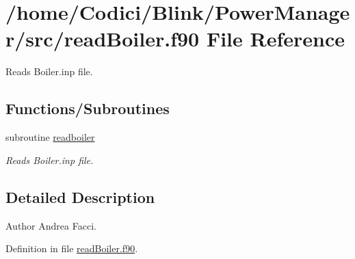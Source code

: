 \hypertarget{read_boiler_8f90}{\section{/home/\-Codici/\-Blink/\-Power\-Manager/src/read\-Boiler.f90 File Reference}
\label{read_boiler_8f90}
}


Reads Boiler.\-inp file.  


\subsection*{Functions/\-Subroutines}
\begin{DoxyCompactItemize}
\item 
subroutine \hyperlink{read_boiler_8f90_adab96107665a1fca087b8e0a54026105}{readboiler}
\begin{DoxyCompactList}\small\item\em Reads Boiler.\-inp file. \end{DoxyCompactList}\end{DoxyCompactItemize}


\subsection{Detailed Description}
\begin{DoxyAuthor}{Author}
Andrea Facci. 
\end{DoxyAuthor}


Definition in file \hyperlink{read_boiler_8f90_source}{read\-Boiler.\-f90}.



